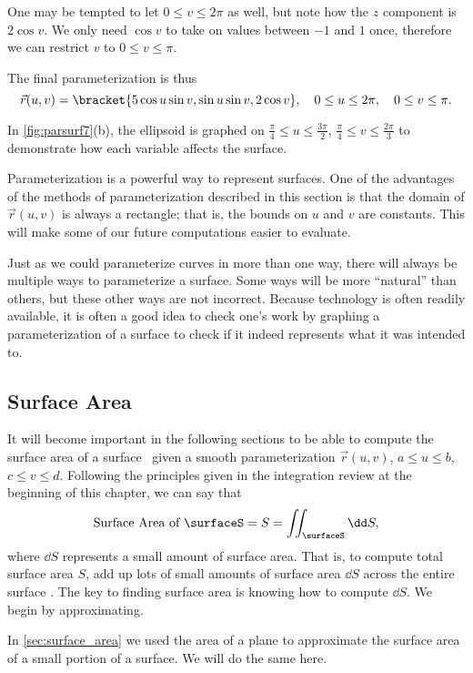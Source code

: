 \begin{example}
One may be tempted to let $0\leq v\leq 2\pi$ as well, but note how the $z$ component is $2\cos v$. We only need $\cos v$ to take on values between $-1$ and $1$ once, therefore we can restrict $v$ to $0\leq v\leq \pi$. 

The final parameterization is thus
\[
\vec r(u,v) =\bracket{5\cos u\sin v, \sin u\sin v,2\cos v},
\quad 0\leq u\leq2\pi,\quad 0\leq v\leq\pi.
\]

In \autoref{fig:parsurf7}(b), the ellipsoid is graphed on $\frac{\pi}{4}\leq u\leq \frac{3\pi}{2}$, $\frac{\pi}4\leq v\leq \frac{2\pi}3$ to demonstrate how each variable affects the surface.
\end{example}

Parameterization is a powerful way to represent surfaces. One of the advantages of the methods of parameterization described in this section is that the domain of $\vec r(u,v)$ is always a rectangle; that is, the bounds on $u$ and $v$ are constants. This will make some of our future computations easier to evaluate.

Just as we could parameterize curves in more than one way, there will always be multiple ways to parameterize a surface. Some ways will be more ``natural'' than others, but these other ways are not incorrect. Because technology is often readily available, it is often a good idea to check one's work by graphing a parameterization of a surface to check if it indeed represents what it was intended to.

\subsection{Surface Area}

It will become important in the following sections to be able to compute the surface area of a surface \surfaceS\ given a smooth parameterization $\vec r(u,v)$, $a\leq u\leq b$, $c\leq v\leq d$. Following the principles given in the integration review at the beginning of this chapter, we can say that
\[\text{Surface Area of \surfaceS}=S = \iint_{\surfaceS}\dd S,\]
where $\dd S$ represents a small amount of surface area. That is, to compute total surface area $S$, add up lots of small amounts of surface area $\dd S$ across the entire surface \surfaceS. The key to finding surface area is knowing how to compute $\dd S$. We begin by approximating.

In \autoref{sec:surface_area} we used the area of a plane to approximate the surface area of a small portion of a surface. We will do the same here.


